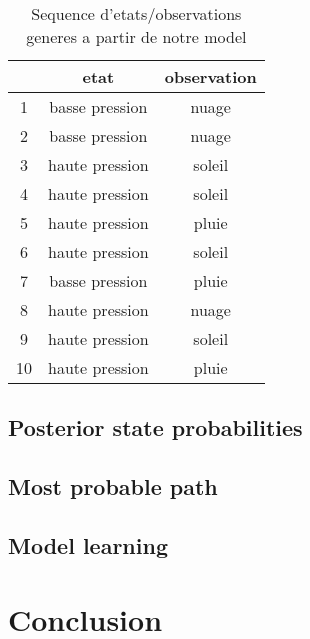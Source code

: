 \documentclass{article}
\begin{document}
\begin{multicols}{2}
\begin{table}[H]
    \begin{center}
        \centering
        \captionsetup{justification=centering}
        \caption{\label{tab:hmmSeq}Sequence d'etats/observations generes a partir de notre model}
        \begin{tabular}{|c|c|c|}
            \hline
            & etat & observation \\
            \hline
            1 & basse pression & nuage \\
            2 & basse pression & nuage \\
            3 & haute pression & soleil \\
            4 & haute pression & soleil \\
            5 & haute pression & pluie \\
            6 & haute pression & soleil \\
            7 & basse pression & pluie \\
            8 & haute pression & nuage \\
            9 & haute pression & soleil \\
            10 & haute pression & pluie \\
            \hline
        \end{tabular}
    \end{center}
\end{table}

\subsection{Posterior state probabilities}

\subsection{Most probable path}

\subsection{Model learning}


\section{Conclusion}\label{sec:conclu}


\end{multicols}
\end{document}
